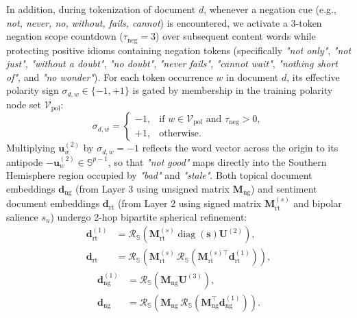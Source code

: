 \documentclass[journal]{IEEEtran}
\begin{document}
In addition, during tokenization of document $d$, whenever a negation cue (e.g., \textit{not, never, no, without, fails, cannot}) is encountered, we activate a 3-token negation scope countdown ($\tau_{\text{neg}} = 3$) over subsequent content words while protecting positive idioms containing negation tokens (specifically \textit{"not only"}, \textit{"not just"}, \textit{"without a doubt"}, \textit{"no doubt"}, \textit{"never fails"}, \textit{"cannot wait"}, \textit{"nothing short of"}, and \textit{"no wonder"}). For each token occurrence $w$ in document $d$, its effective polarity sign $\sigma_{d,w} \in \{-1, +1\}$ is gated by membership in the training polarity node set $\mathcal{V}_{\text{pol}}$:
\begin{equation}
\sigma_{d,w} = \begin{cases}
-1, & \text{if } w \in \mathcal{V}_{\text{pol}} \text{ and } \tau_{\text{neg}} > 0, \\
+1, & \text{otherwise.}
\end{cases}
\label{eq:negation_gate}
\end{equation}
Multiplying $\mathbf{u}_w^{(2)}$ by $\sigma_{d,w} = -1$ reflects the word vector across the origin to its antipode $-\mathbf{u}_w^{(2)} \in \mathbb{S}^{p-1}$, so that \textit{"not good"} maps directly into the Southern Hemisphere region occupied by \textit{"bad"} and \textit{"stale"}. Both topical document embeddings $\mathbf{d}_{\text{ng}}$ (from Layer 3 using unsigned matrix $\mathbf{M}_{\text{ng}}$) and sentiment document embeddings $\mathbf{d}_{\text{rt}}$ (from Layer 2 using signed matrix $\mathbf{M}_{\text{rt}}^{(s)}$ and bipolar salience $s_u$) undergo 2-hop bipartite spherical refinement:
\begin{equation}
\begin{aligned}
\mathbf{d}_{\text{rt}}^{(1)} &= \mathcal{R}_{\mathbb{S}}\!\left(\mathbf{M}_{\text{rt}}^{(s)} \operatorname{diag}(\mathbf{s})\mathbf{U}^{(2)}\right), \\
\mathbf{d}_{\text{rt}} &= \mathcal{R}_{\mathbb{S}}\!\left(\mathbf{M}_{\text{rt}}^{(s)} \, \mathcal{R}_{\mathbb{S}}\!\left(\mathbf{M}_{\text{rt}}^{(s)\top}\mathbf{d}_{\text{rt}}^{(1)}\right)\right),
\end{aligned}
\label{eq:doc_rt}
\end{equation}
\begin{equation}
\begin{aligned}
\mathbf{d}_{\text{ng}}^{(1)} &= \mathcal{R}_{\mathbb{S}}\!\left(\mathbf{M}_{\text{ng}}\mathbf{U}^{(3)}\right), \\
\mathbf{d}_{\text{ng}} &= \mathcal{R}_{\mathbb{S}}\!\left(\mathbf{M}_{\text{ng}} \, \mathcal{R}_{\mathbb{S}}\!\left(\mathbf{M}_{\text{ng}}^\top\mathbf{d}_{\text{ng}}^{(1)}\right)\right).
\end{aligned}
\label{eq:doc_ng}
\end{equation}
\end{document}
